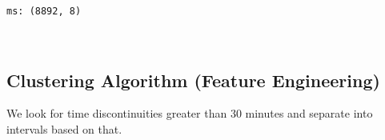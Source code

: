 \documentclass[11pt]{article}
\begin{document}
    \begin{Verbatim}[commandchars=\\\{\}]
ms: (8892, 8)

    \end{Verbatim}

    \begin{center}
    \end{center}
    { \hspace*{\fill} \\}
    
    \subsection{Clustering Algorithm (Feature
Engineering)}\label{clustering-algorithm-feature-engineering}

We look for time discontinuities greater than 30 minutes and separate
into intervals based on that.
\end{document}
